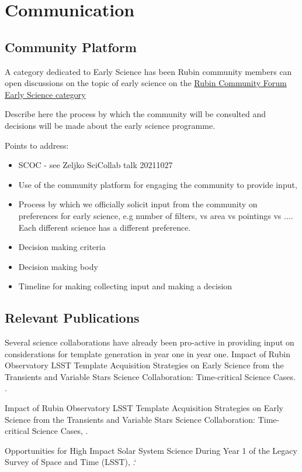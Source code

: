 
\section{Communication}

\subsection{Community Platform}

A category dedicated to Early Science has been 
Rubin community members can open discussions on the topic of early science on the \href{https://community.lsst.org/t/about-the-early-science-category/5775}{Rubin Community Forum Early Science category}

Describe here the process by which the community will be consulted and decisions will be made about the early science programme. 

Points to address:
\begin{itemize}
\item SCOC - see Zeljko SciCollab talk 20211027
\item Use of the community platform for engaging the community to provide input,
\item Process by which we officially solicit  input from the community on preferences for early science, e.g number of filters, vs area vs pointings vs .... Each different science has a different preference. 
\item Decision making criteria 
\item Decision making body
\item Timeline for making collecting input and making a decision
\end{itemize}

\subsection{Relevant Publications}

Several science collaborations have already been pro-active in providing input on considerations for template generation in year one in year one. 
{\texbf  Impact of Rubin Observatory LSST Template Acquisition Strategies on Early Science from the Transients and Variable Stars Science Collaboration: Time-critical Science Cases.} .

{\texbf  Impact of Rubin Observatory LSST Template Acquisition Strategies on Early Science from the Transients and Variable Stars Science Collaboration: Time-critical Science Cases,} .

{\texbf  Opportunities for High Impact Solar System Science During Year 1 of the Legacy Survey of Space
and Time (LSST)},  .`

